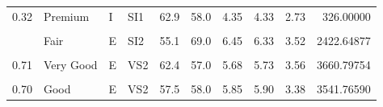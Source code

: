 \documentclass[
]{article}
\begin{document}
\begin{table}[!h]
{\begin{tabular}[t]{rlllrrrrrr}
0.32 & Premium & I & SI1 & 62.9 & 58.0 & 4.35 & 4.33 & 2.73 & 326.00000\\
\cellcolor{gray!6}{0.70} & \cellcolor{gray!6}{Ideal} & \cellcolor{gray!6}{E} & \cellcolor{gray!6}{SI1} & \cellcolor{gray!6}{62.5} & \cellcolor{gray!6}{57.0} & \cellcolor{gray!6}{5.70} & \cellcolor{gray!6}{5.72} & \cellcolor{gray!6}{3.57} & \cellcolor{gray!6}{2996.88262}\\
\addlinespace
0.86 & Fair & E & SI2 & 55.1 & 69.0 & 6.45 & 6.33 & 3.52 & 2422.64877\\
\cellcolor{gray!6}{0.70} & \cellcolor{gray!6}{Ideal} & \cellcolor{gray!6}{G} & \cellcolor{gray!6}{VS2} & \cellcolor{gray!6}{61.6} & \cellcolor{gray!6}{56.0} & \cellcolor{gray!6}{5.70} & \cellcolor{gray!6}{5.67} & \cellcolor{gray!6}{3.50} & \cellcolor{gray!6}{3429.13881}\\
0.71 & Very Good & E & VS2 & 62.4 & 57.0 & 5.68 & 5.73 & 3.56 & 3660.79754\\
\cellcolor{gray!6}{0.78} & \cellcolor{gray!6}{Very Good} & \cellcolor{gray!6}{G} & \cellcolor{gray!6}{SI2} & \cellcolor{gray!6}{63.8} & \cellcolor{gray!6}{56.0} & \cellcolor{gray!6}{5.81} & \cellcolor{gray!6}{5.85} & \cellcolor{gray!6}{3.72} & \cellcolor{gray!6}{2355.13596}\\
0.70 & Good & E & VS2 & 57.5 & 58.0 & 5.85 & 5.90 & 3.38 & 3541.76590\\
\bottomrule
\end{tabular}}
\end{table}
\end{document}
